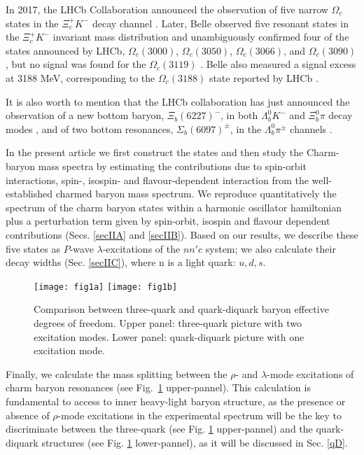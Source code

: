 \documentclass[twocolumn,superscriptaddress,preprintnumbers,nofootinbib]{revtex4}
\begin{document}
In 2017, the LHCb Collaboration announced the observation of five narrow $\Omega_{ c}$ states in the $\Xi _{c}^{+}K^{-}$  decay channel \cite{Aaij:2017nav}.
Later,  Belle  observed five resonant states in the $\Xi_c^{+} K^{-}$ invariant mass distribution and unambiguously confirmed four of the states announced by LHCb, $\Omega_{ c}(3000)$, $\Omega_{ c}(3050)$, $\Omega_{ c}(3066)$, and $\Omega_{ c}(3090)$, but no signal was found for the $\Omega_{ c}(3119)$ \cite{Yelton:2017qxg}. 
Belle also measured a signal excess at 3188 MeV,  corresponding to the $\Omega_{ c}(3188)$ state reported by LHCb 
\cite{Yelton:2017qxg}.

It is also worth to mention that the LHCb collaboration has just announced the observation of a new bottom baryon, $\Xi_b(6227)^-$, in both $\Lambda_b^0 K^-$ and $\Xi^0_b \pi$ decay modes \cite{Aaij:2018yqz}, and of two bottom resonances, $\Sigma_b(6097)^\pm$, in the $\Lambda_b^0 \pi^\pm$ channels \cite{Aaij:2018tnn}. 





In the present article we first construct the states and
then study the  Charm-baryon mass spectra by estimating the contributions due to spin-orbit interactions, spin-, isospin- and flavour-dependent
interaction from the well-established charmed baryon mass spectrum. We reproduce quantitatively the spectrum of  the charm baryon states 
 within a harmonic oscillator hamiltonian plus a perturbation  term given by spin-orbit, isospin and flavour dependent  contributions (Secs. \ref{secIIA} and  \ref{secIIB}).
Based on our results, we  describe these five states as $P$-wave $\lambda$-excitations of the $nn'c$ system; we also calculate their  decay widths (Sec. \ref{secIIC}), where n is a light quark: $u,d,s$.

\begin{figure}[htbp]
\begin{center}
\texttt{[image: fig1a]}
\texttt{[image: fig1b]}
\caption{Comparison between three-quark and quark-diquark baryon effective degrees of freedom. Upper  panel: three-quark picture with two excitation modes. Lower panel:  quark-diquark picture with one excitation mode.}
\label{comparison}
\end{center}
\end{figure}
Finally, we calculate  the mass splitting between the $\rho$- and $\lambda$-mode excitations of charm baryon resonances (see Fig.~\ref{comparison} upper-pannel).
This calculation is  fundamental to access to inner heavy-light baryon structure,
as the presence or absence of $\rho$-mode excitations in the experimental spectrum
will be the key to discriminate between the three-quark (see Fig. \ref{comparison}  upper-pannel)  and the quark-diquark structures (see Fig. \ref{comparison}  lower-pannel),  as it will be discussed in Sec. \ref{qD}.
\end{document}
